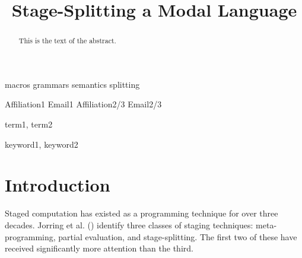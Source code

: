 \documentclass{sigplanconf}
\begin{document}
 {macros}
 {grammars}
 {semantics}
 {splitting}

\setlength{\pdfpageheight}{\paperheight}
\setlength{\pdfpagewidth}{\paperwidth}






\title{Stage-Splitting a Modal Language}

           {Affiliation1}
           {Email1}
           {Affiliation2/3}
           {Email2/3}

\maketitle

\begin{abstract}
This is the text of the abstract.
\end{abstract}


\terms
term1, term2

\keywords
keyword1, keyword2

\section{Introduction}

Staged computation has existed as a programming technique for over three decades.  Jorring et al. (\cite{jorring86}) identify three classes of staging techniques: meta-programming, partial evaluation, and stage-splitting.  The first two of these have received significantly more attention than the third.
\end{document}
